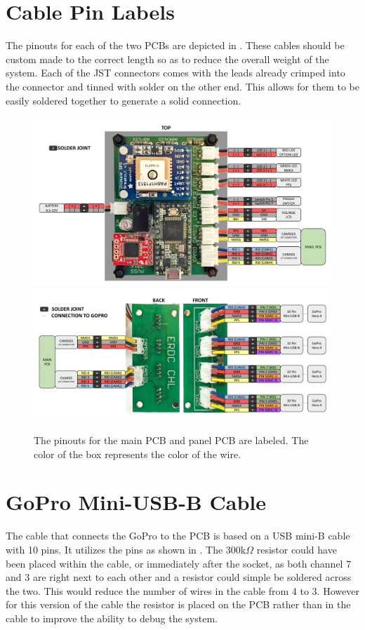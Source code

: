 \section{Cable Pin Labels}
The pinouts for each of the two PCBs are depicted in .  These cables should be custom made to the correct length so as to reduce the overall weight of the system.  Each of the JST connectors comes with the leads already crimped into the connector and tinned with solder on the other end.  This allows for them to be easily soldered together to generate a solid connection.  
\begin{figure}[H]
	\centering
	\includegraphics[scale = 0.5]{../figures/pinoutmainPCB.pdf}
	\includegraphics[scale = 0.5]{../figures/pinoutpanelPCB.pdf}
	\caption{The pinouts for the main PCB and panel PCB are labeled.  The color of the box represents the color of the wire. }
	\label{fig:pinouts}
\end{figure}

\section{GoPro Mini-USB-B Cable}
The cable that connects the GoPro to the PCB is based on a USB mini-B cable with 10 pins.  It utilizes the pins as shown in .  The 300k$\Omega$ resistor could have been placed within the cable, or immediately after the socket, as both channel 7 and 3 are right next to each other and a resistor could simple be soldered across the two.  This would reduce the number of wires in the cable from 4 to 3.  However for this version of the cable the resistor is placed on the PCB rather than in the cable to improve the ability to debug the system.  

